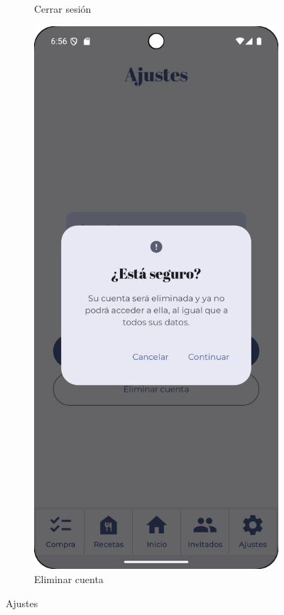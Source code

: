 \begin{figure}[H]
\begin{subfigure}[b]{0.3\textwidth}
      \caption{Cerrar sesión}
      \label{fig:sign-out}
    \end{subfigure}
    \hfill
    \begin{subfigure}[b]{0.3\textwidth}
      \includegraphics[width=\textwidth]{./img/manual/delete_account_confirm.png}
      \caption{Eliminar cuenta}
      \label{fig:delete}
    \end{subfigure}

    \caption{Ajustes}
    \label{fig:settings}
\end{figure}

